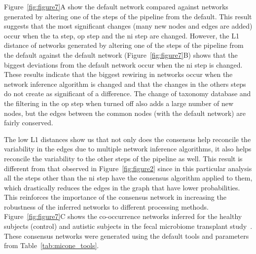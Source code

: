   Figure~\ref{fig:figure7}A show the default network compared against networks generated by altering one of the steps of the pipeline from the default.
  This result suggests that the most significant changes (many new nodes and edges are added) occur when the \ac{ta} step, \ac{op} step and the \ac{ni} step are changed.
  However, the L1 distance of networks generated by altering one of the steps of the pipeline from the default against the default network (Figure~\ref{fig:figure7}B) shows that the biggest deviations from the default network occur when the \ac{ni} step is changed.
  These results indicate that the biggest rewiring in networks occur when the network inference algorithm is changed and that the changes in the others steps do not create as significant of a difference.
  The change of taxonomy database and the filtering in the \ac{op} step when turned off also adds a large number of new nodes, but the edges between the common nodes (with the default network) are fairly conserved.

  The low L1 distances show us that not only does the consensus help reconcile the variability in the edges due to multiple network inference algorithms, it also helps reconcile the variability to the other steps of the pipeline as well.
  This result is different from that observed in Figure~\ref{fig:figure2} since in this particular analysis all the steps other than the \ac{ni} step have the consensus algorithm applied to them, which drastically reduces the edges in the graph that have lower probabilities.
  This reinforces the importance of the consensus network in increasing the robustness of the inferred networks to different processing methods.
  Figure~\ref{fig:figure7}C shows the co-occurrence networks inferred for the healthy subjects (control) and autistic subjects in the fecal microbiome transplant study~\cite{Kang2017}.
  These consensus networks were generated using the default tools and parameters from Table~\ref{tab:micone_tools}.
